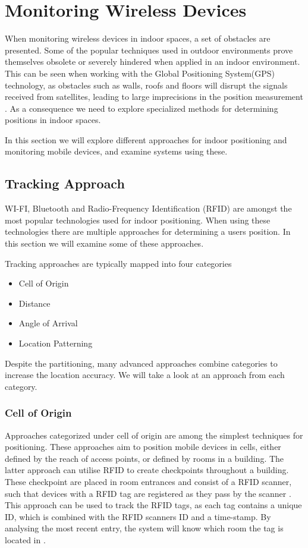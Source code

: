 \section{Monitoring Wireless Devices}\label{sec:monitoring} 
When monitoring wireless devices in indoor spaces, a set of obstacles are presented. Some of the popular techniques used in outdoor environments prove themselves obsolete or severely hindered when applied in an indoor environment. This can be seen when working with the Global Positioning System(GPS) technology, as obstacles such as walls, roofs and floors will disrupt the signals received from satellites, leading to large imprecisions in the position measurement \cite{gps_indoor}. As a consequence we need to explore specialized methods for determining positions in indoor spaces.

In this section we will explore different approaches for indoor positioning and monitoring mobile devices, and examine systems using these.

\subsection{Tracking Approach}\label{sec:tracking_approach}
WI-FI, Bluetooth and Radio-Frequency Identification (RFID) are amongst the most popular technologies used for indoor positioning. When using these technologies there are multiple approaches for determining a users position. In this section we will examine some of these approaches.

Tracking approaches are typically mapped into four categories \cite{tracking_approaches}
\begin{itemize}
\item Cell of Origin
\item Distance
\item Angle of Arrival
\item Location Patterning
\end{itemize}
Despite the partitioning, many advanced approaches combine categories to increase the location accuracy. We will take a look at an approach from each category.

\subsubsection*{Cell of Origin}
Approaches categorized under cell of origin are among the simplest techniques for positioning. These approaches aim to position mobile devices in cells, either defined by the reach of access points, or defined by rooms in a building.
The latter approach can utilise RFID to create checkpoints throughout a building. These checkpoint are placed in room entrances and consist of a RFID scanner, such that devices with a RFID tag are registered as they pass by the scanner \cite{indoor_bin}. 
This approach can be used to track the RFID tags, as each tag contains a unique ID, which is combined with the RFID scanners ID and a time-stamp. By analysing the most recent entry, the system will know which room the tag is located in \cite{RFIDjournal}.

